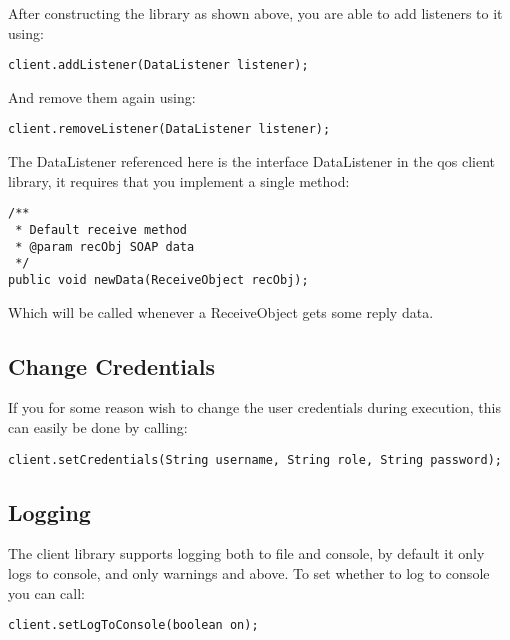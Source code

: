     After constructing the library as shown above, you are able to add listeners to it using:
    
\begin{lstlisting}[caption={Add listener}, label=userguideAddlistener]
    client.addListener(DataListener listener);
\end{lstlisting}

    And remove them again using:
    
\begin{lstlisting}[caption={Remove listener}, label=userguideRemovelistener]
    client.removeListener(DataListener listener);
\end{lstlisting}

    The DataListener referenced here is the interface DataListener in the qos client library, it requires that you implement a single method:

\begin{lstlisting}[caption={The DataListener interface}, label=userguideDatalistener]
/**
 * Default receive method
 * @param recObj SOAP data
 */
public void newData(ReceiveObject recObj);
\end{lstlisting}

    Which will be called whenever a ReceiveObject gets some reply data.

\subsection{Change Credentials}\label{Change Credentials}
    
    If you for some reason wish to change the user credentials during execution, this can easily be done by calling:
    
\begin{lstlisting}[caption={Changing user credentials}, label=userguideCredentials]
    client.setCredentials(String username, String role, String password);
\end{lstlisting}

\subsection{Logging}\label{userguideLogging}

    The client library supports logging both to file and console, by default it only logs to console, and only warnings and above. To set whether to log to console you can call:

\begin{lstlisting}[caption={Turn logging to console on or off}, label=userguideTogglelogtoconsole]
    client.setLogToConsole(boolean on);
\end{lstlisting}

